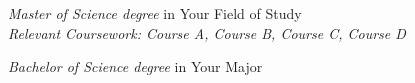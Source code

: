 \textit{Master of Science degree} in Your Field of Study\\
{\small\textit{Relevant Coursework: Course A, Course B, Course C, Course D} }

\textit{Bachelor of Science degree} in Your Major
